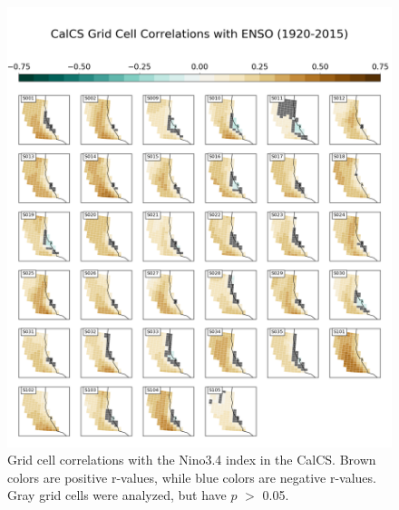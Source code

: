 \documentclass[12pt]{article}
\begin{document}
\newpage
\begin{figure}[!h]
	\centering
	\includegraphics[width=\linewidth]{../../figs/calcs/spatial-correlations/calcs-grid-cell-correlations-nino34-postage.png}
	\caption{Grid cell correlations with the Nino3.4 index in the CalCS. Brown colors are positive r-values, while blue colors are negative r-values. Gray grid cells were analyzed, but have $p$ $>$ 0.05.}
	\label{fig:CalCS-ENSO-Spatial}
\end{figure}
\newpage
\end{document}
